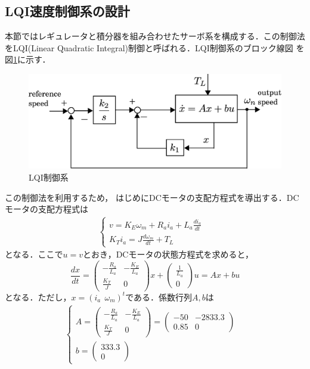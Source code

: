 \documentclass[a4paper,12pt]{jarticle}
\begin{document}
\subsection{LQI速度制御系の設計}
本節ではレギュレータと積分器を組み合わせたサーボ系を構成する．この制御法
をLQI(Linear Quadratic Integral)制御と呼ばれる．LQI制御系のブロック線図
を図\ref{fig:LQI_model}に示す．
%
\begin{figure}[htbp]
 \begin{center}
  \includegraphics[width = 150mm]{fig/LQI_model.eps}
 \end{center}
 \caption{LQI制御系}
 \label{fig:LQI_model}
\end{figure}
%
この制御法を利用するため，
はじめにDCモータの支配方程式を導出する．DCモータの支配方程式は
%
\begin{eqnarray}
 \begin{cases}
  v = K_{E}\omega_m + R_{a}i_{a} + L_{a} \frac{di_a}{dt} & \\
  K_{T}i_a = J \frac{d\omega_m}{dt} + T_{L}
 \end{cases}
\end{eqnarray}
%
となる．ここで$u=v$とおき，DCモータの状態方程式を求めると，
\begin{equation}
 \frac{dx}{dt} =
  \begin{pmatrix}
   - \frac{R_a}{L_a} & -\frac{K_E}{L_a} \\
   \frac{K_T}{J} & 0
  \end{pmatrix}
  x +
\begin{pmatrix}
 \frac{1}{L_a} \\
 0
\end{pmatrix}
u = Ax + bu
\end{equation}
となる．ただし，$x=(i_a \ \ \omega_m)^t$である．係数行列$A,b$は
%
\begin{eqnarray}
 \begin{cases}
A=
  \begin{pmatrix}
   - \frac{R_a}{L_a} & -\frac{K_E}{L_a} \\
   \frac{K_T}{J} & 0
  \end{pmatrix}
  =
  \begin{pmatrix}
   -50  & -2833.3 \\
   0.85 & 0
  \end{pmatrix}
  & \\
  b =
  \begin{pmatrix}
   333.3 \\
   0
  \end{pmatrix}
 \end{cases}
\end{eqnarray}
\end{document}
